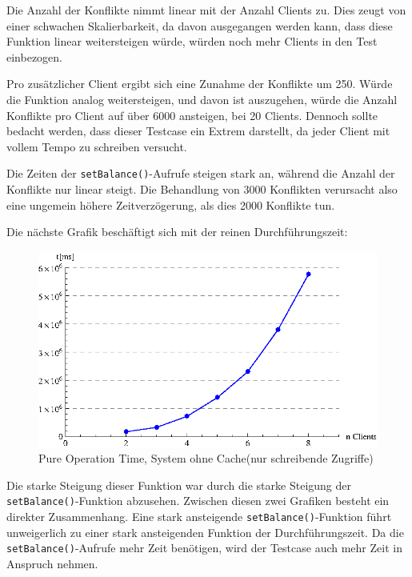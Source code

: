 Die Anzahl der Konflikte nimmt linear mit der Anzahl Clients zu. Dies zeugt von einer schwachen Skalierbarkeit, da davon ausgegangen werden kann, dass diese Funktion linear weitersteigen würde, würden noch mehr Clients in den Test einbezogen.  

Pro zusätzlicher Client ergibt sich eine Zunahme der Konflikte um 250. Würde die Funktion analog weitersteigen, und davon ist auszugehen, würde die Anzahl Konflikte pro Client auf über 6000 ansteigen, bei 20 Clients. Dennoch sollte bedacht werden, dass dieser Testcase ein Extrem darstellt, da jeder Client mit vollem Tempo zu schreiben versucht. 

Die Zeiten der \texttt{setBalance()}-Aufrufe steigen stark an, während die Anzahl der Konflikte nur linear steigt. Die Behandlung von 3000 Konflikten verursacht also eine ungemein höhere Zeitverzögerung, als dies 2000 Konflikte tun. 

Die nächste Grafik beschäftigt sich mit der reinen Durchführungszeit:
\begin{figure}[H]
\begin{center}
\includegraphics[width=\textwidth]{images_MessErgebnisse/incrementCachePureOperationTime.eps}
\end{center}
\caption{Pure Operation Time, System ohne Cache(nur schreibende Zugriffe)}
\end{figure}

Die starke Steigung dieser Funktion war durch die starke Steigung der \texttt{setBalance()}-Funktion abzusehen. Zwischen diesen zwei Grafiken besteht ein direkter Zusammenhang. Eine stark ansteigende \texttt{setBalance()}-Funktion führt unweigerlich zu einer stark ansteigenden Funktion der Durchführungszeit. Da die \texttt{setBalance()}-Aufrufe mehr Zeit benötigen, wird der Testcase auch mehr Zeit in Anspruch nehmen.

